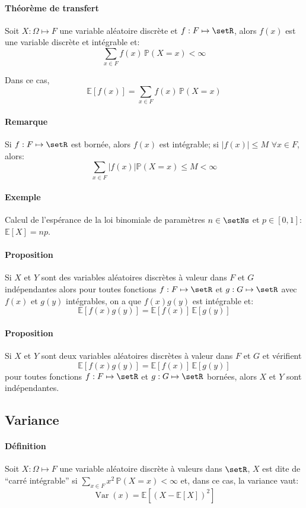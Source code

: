 \documentclass[a4paper,10pt,french,openany]{memoir}
\newcommand{\Proba}{\mathbb{P}}
\newcommand{\Esper}{\mathbb{E}}
\newcommand{\abs}[1]{\lvert #1 \rvert}
\DeclareMathOperator{\Var}{Var}
\begin{document}
\paragraph{Théorème de transfert}
Soit $X:\Omega \mapsto F$ une variable aléatoire discrète et $f:F \mapsto \setR$, alors $f(x)$ est une variable discrète et intégrable et: \[\sum_{x\in F} f(x) \,\Proba(X=x) < \infty\]

Dans ce cas, \[\Esper[f(x)] = \sum_{x\in F} f(x) \,\Proba(X=x)\]

\paragraph{Remarque}
Si $f: F\mapsto\setR$ est bornée, alors $f(x)$ est intégrable; si $\abs{f(x)} \leq M$ $\forall x \in F$, alors: \[\sum_{x\in F} \abs{f(x)} \Proba(X=x) \leq M < \infty\]

\paragraph{Exemple}
Calcul de l'espérance de la loi binomiale de paramètres $n\in\setNs$ et $p\in[0,1]$: $\Esper[X]=n p$.

\paragraph{Proposition}
Si $X$ et $Y$ sont des variables aléatoires discrètes à valeur dans $F$ et $G$ indépendantes alors pour toutes fonctions $f: F\mapsto \setR$ et $g: G\mapsto \setR$ avec $f(x)$ et $g(y)$ intégrables, on a que $f(x) g(y)$ est intégrable et:\[\Esper[f(x) g(y)]=\Esper[f(x)] \,\Esper[g(y)]\]

\paragraph{Proposition}
Si $X$ et $Y$ sont deux variables aléatoires discrètes à valeur dans $F$ et $G$ et vérifient \[\Esper[f(x) g(y)] = \Esper[f(x)]\,\Esper[g(y)]\] pour toutes fonctions $f:F\mapsto \setR$ et $g: G\mapsto \setR$ bornées, alors $X$ et $Y$ sont indépendantes.

\subsection{Variance}

\paragraph{Définition}
Soit $X:\Omega \mapsto F$ une variable aléatoire discrète à valeurs dans $\setR$, $X$ est dite de ``carré intégrable'' si $\sum_{x\in F}x^2\, \Proba(X=x) < \infty$ et, dans ce cas, la variance vaut: \[\Var(x)=\Esper[(X-\Esper[X])^2]\]
\end{document}
